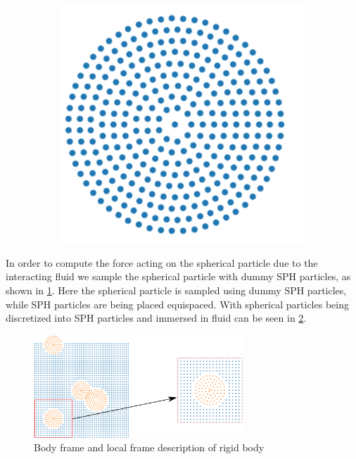 \documentclass[preprint,12pt]{elsarticle}
\begin{document}
\begin{figure}[!htpb]
\begin{subfigure}{0.24\textwidth}
    \includegraphics[width=1.0\textwidth]{images/rfc_explantion_schematic/sph_sampled_spherical_particles}
    \subcaption{}%
  \end{subfigure}
  \caption{}
\label{fig:real_particle_sph_sampling}
\end{figure}
In order to compute the force acting on the spherical particle due to the
interacting fluid we sample the spherical particle with dummy SPH particles,
as shown in \cref{fig:real_particle_sph_sampling}. Here the spherical particle
is sampled using dummy SPH particles, while SPH particles are being placed
equispaced. With spherical particles being discretized into SPH particles and
immersed in fluid can be seen in \cref{fig:many_rb_in_fluid_sph_particles}.
\begin{figure}[!htpb]
  \centering
  \includegraphics[width=0.7\textwidth]{images/rfc_zoomed_combined}
  \caption{Body frame and local frame description of rigid body}
  \label{fig:many_rb_in_fluid_sph_particles}
\end{figure}
\end{document}
